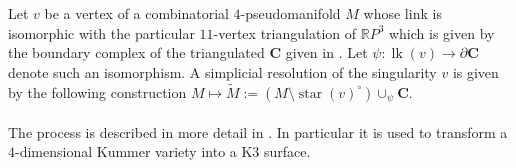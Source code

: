\documentclass[a4paper,11pt]{report}
\begin{document}
{{ Let $v$ be a vertex of a combinatorial $4$-pseudomanifold $M$ whose link is isomorphic with the particular $11$-vertex triangulation of $\mathbb{R}P^3$ which is given by the boundary complex of the triangulated $\mathbf{C}$ given in \cite{Spreer09CombPorpsOfK3}. Let $\psi : \operatorname{lk}(v) \rightarrow \partial\mathbf{C}$ denote such an isomorphism. A simplicial resolution of the singularity $v$ is given by the following construction $M \mapsto \widetilde{M} := (M \setminus \operatorname{star}(v)^\circ)
\cup_{\psi} \mathbf{C}.$\\
\\
 The process is described in more detail in \cite{Spreer09CombPorpsOfK3}. In particular it is used to transform a $4$-dimensional Kummer variety into a K3 surface. }

 }

 
\end{document}

